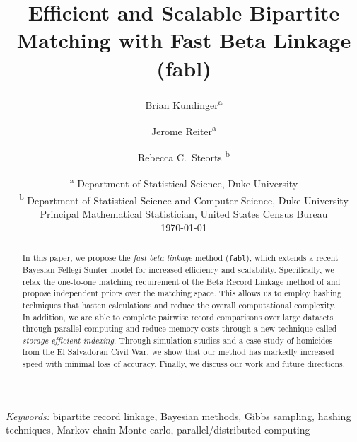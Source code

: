 \documentclass[12pt,letterpaper]{article}
\title{Efficient and Scalable Bipartite Matching with Fast Beta Linkage  (fabl)}
\author{Brian Kundinger\textsuperscript{a} \and
  Jerome Reiter\textsuperscript{a} \and 
  Rebecca C.~Steorts \textsuperscript{b}}
\date{
 \textsuperscript{a} Department of Statistical Science, Duke University \\
 \textsuperscript{b} Department of Statistical Science and Computer Science, Duke University\\Principal Mathematical Statistician, United States Census Bureau\\[2ex]
  \today}
\newcommand{\1}[1]{\mathbb{I}\!\left[#1\right]} %
\begin{document}
\maketitle

\bigskip
\begin{abstract}


In this paper, we propose the \emph{fast beta linkage} method (\texttt{fabl}), which extends a recent Bayesian Fellegi Sunter model for increased efficiency and scalability. Specifically, we relax the one-to-one matching requirement of the Beta Record Linkage method of \citep{sadinle_bayesian_2017} and propose independent priors over the matching space. This allows us to employ hashing techniques that hasten calculations and reduce the overall computational complexity. In addition, we are able to complete pairwise record comparisons over large datasets through parallel computing and reduce memory costs through a new technique called \emph{storage efficient indexing}. Through simulation studies and a case study of homicides from the El Salvadoran Civil War, we show that our method has markedly increased speed with minimal loss of accuracy. Finally, we discuss our work and future directions. 

\end{abstract}


\noindent%
{\it Keywords:} bipartite record linkage, Bayesian methods, Gibbs sampling, hashing techniques, Markov chain Monte carlo, parallel/distributed computing
\end{document}
